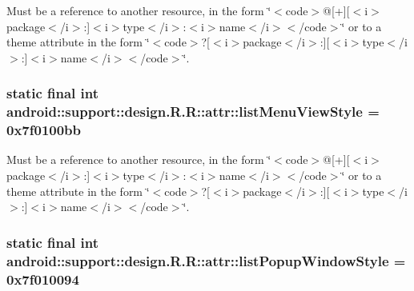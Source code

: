 Must be a reference to another resource, in the form \char`\"{}$<$code$>$@\mbox{[}+\mbox{]}\mbox{[}$<$i$>$package$<$/i$>$:\mbox{]}$<$i$>$type$<$/i$>$:$<$i$>$name$<$/i$>$$<$/code$>$\char`\"{} or to a theme attribute in the form \char`\"{}$<$code$>$?\mbox{[}$<$i$>$package$<$/i$>$:\mbox{]}\mbox{[}$<$i$>$type$<$/i$>$:\mbox{]}$<$i$>$name$<$/i$>$$<$/code$>$\char`\"{}. \hypertarget{classandroid_1_1support_1_1design_1_1_r_1_1attr_026613a1ce6fb8f0074d3bcdcb39294d}{
\subsubsection[{listMenuViewStyle}]{\setlength{\rightskip}{0pt plus 5cm}static final int android::support::design.R.R::attr::listMenuViewStyle = 0x7f0100bb}}
\label{classandroid_1_1support_1_1design_1_1_r_1_1attr_026613a1ce6fb8f0074d3bcdcb39294d}


Must be a reference to another resource, in the form \char`\"{}$<$code$>$@\mbox{[}+\mbox{]}\mbox{[}$<$i$>$package$<$/i$>$:\mbox{]}$<$i$>$type$<$/i$>$:$<$i$>$name$<$/i$>$$<$/code$>$\char`\"{} or to a theme attribute in the form \char`\"{}$<$code$>$?\mbox{[}$<$i$>$package$<$/i$>$:\mbox{]}\mbox{[}$<$i$>$type$<$/i$>$:\mbox{]}$<$i$>$name$<$/i$>$$<$/code$>$\char`\"{}. \hypertarget{classandroid_1_1support_1_1design_1_1_r_1_1attr_38768d58c7349a39add0ede84e0bbcfb}{
\subsubsection[{listPopupWindowStyle}]{\setlength{\rightskip}{0pt plus 5cm}static final int android::support::design.R.R::attr::listPopupWindowStyle = 0x7f010094}}
\label{classandroid_1_1support_1_1design_1_1_r_1_1attr_38768d58c7349a39add0ede84e0bbcfb}



